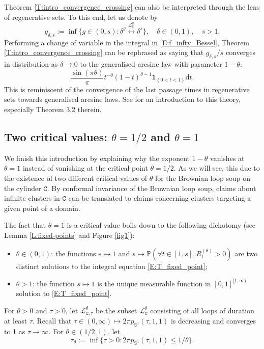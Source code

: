 \documentclass[11pt]{article}
\theoremstyle{remark}
\newcommand{\D}{\mathbb{D}}
\newcommand{\Lc}{\mathcal{L}}
\renewcommand{\P}{\mathbb{P}}
\newcommand{\indic}[1]{ \mathbf{1}_{ \left\{ #1 \right\} } }
\renewcommand{\d}{\mathrm{d}}
\newcommand{\cyl}{\mathtt{C}}
\numberwithin{equation}{section}
\begin{document}
Theorem \ref{T:intro_convergence_crossing} can also be interpreted through the lens of regenerative sets. To this end, let us denote by
\[
g_{\delta,s} := \inf \{ g \in (0,s): \delta^g \overset{\Lc_\D^\theta}{\longleftrightarrow} \delta^s \}, \quad \delta \in (0,1), \quad s > 1.
\]
Performing a change of variable in the integral in \eqref{E:f_infty_Bessel}, Theorem \ref{T:intro_convergence_crossing} can be rephrased as saying that $g_{\delta,s} / s$ converges in distribution as $\delta \to 0$ to the generalised arcsine law with parameter $1-\theta$:
\begin{equation}
\label{E:arcsine_law}
\frac{\sin(\pi \theta)}{\pi} t^{-\theta} (1-t)^{\theta-1} \indic{0<t<1} \d t.
\end{equation}
This is reminiscent of the convergence of the last passage times in regenerative sets towards generalised arcsine laws. See \cite{Bertoin1999} for an introduction to this theory, especially Theorem 3.2 therein.



\subsection{\texorpdfstring{Two critical values: $\theta = 1/2$ and $\theta = 1$}{Two critical values: theta = 1/2 and theta = 1}}\label{S:intro_2values}
We finish this introduction by explaining why the exponent $1-\theta$ vanishes at $\theta = 1$ instead of vanishing at the critical point $\theta = 1/2$.
As we will see, this due to the existence of two different critical values of $\theta$ for the Brownian loop soup on the cylinder $\cyl$.
By conformal invariance of the Brownian loop soup, claims about infinite clusters in $\cyl$ can be translated to claims concerning clusters targeting a given point of a domain.

The fact that $\theta = 1$ is a critical value boils down to the following dichotomy (see Lemma \ref{L:fixed-points} and Figure \ref{fig1}):
\begin{itemize}
\item
$\theta \in (0,1)$: the functions $s \mapsto 1$ and $s \mapsto \P ( \forall t \in [1,s], R_t^{(\theta)} >0 )$ are two distinct solutions to the integral equation \eqref{E:T_fixed_point};
\item
$\theta>1$: the function $s \mapsto 1$ is the unique measurable function in $[0,1]^{[1,\infty)}$ solution to \eqref{E:T_fixed_point}.
\end{itemize}

For $\theta >0$ and $\tau >0$, let $\Lc_{\cyl,\tau}^\theta$ be the subset $\Lc_\cyl^\theta$ consisting of all loops of duration at least $\tau$.
Recall that $\tau \in (0,\infty) \mapsto 2\pi p_{\mathbb{S}^1}(\tau,1,1)$ is decreasing and converges to 1 as $\tau \to \infty$.
For $\theta \in (1/2,1)$, let
\begin{equation}
\label{E:t_theta}
\tau_\theta := \inf \{ \tau>0: 2\pi p_{\mathbb{S}^1}(\tau,1,1) \leq 1 / \theta \}.
\end{equation}
\end{document}
